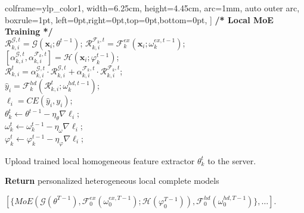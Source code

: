 \documentclass[sigconf]{acmart}
\begin{document}
\begin{algorithm}[h]
{{{\begin{tcolorbox}
                  colframe=ylp_color1,%
                  width=6.25cm,%
                  height=4.45cm,
                  arc=1mm, auto outer arc,
                  boxrule=1pt,
                  left=0pt,right=0pt,top=0pt,bottom=0pt,
                 ]
                 \textbf{/* Local MoE Training */} \\
                    $\boldsymbol{\mathcal{R}}_{k, i}^{\mathcal{G}, t}=\mathcal{G}(\boldsymbol{x}_i ; \theta^{t-1})$;
                    $\boldsymbol{\mathcal{R}}_{k, i}^{\mathcal{F}_{k},t}=\mathcal{F}_k^{e x}(\boldsymbol{x}_i ; \omega_k^{e x, t-1})$; \\
                    $[\alpha_{k, i}^{\mathcal{G}, t}, \alpha_{k, i}^{\mathcal{F}_{k}, t}]=\mathcal{H}(\boldsymbol{x}_i ; \varphi_k^{t-1})$; \\
                    $\boldsymbol{\mathcal{R}}_{k, i}^t=\alpha_{k, i}^{\mathcal{G}, t} \cdot \boldsymbol{\mathcal{R}}_{k, i}^{\mathcal{G}, t}+\alpha_{k, i}^{\mathcal{F}_{k}, t} \cdot \boldsymbol{\mathcal{R}}_{k, i}^{\mathcal{F}_{k},t}$; \\
                    $\hat{y}_i=\mathcal{F}_k^{h d}(\boldsymbol{\mathcal{R}}_{k, i}^t ; \omega_k^{h d, t-1})$; \\
                    $\ell_i=C E(\hat{y}_i, y_i)$; \\
                    $\theta_k^t \gets \theta^{t-1}-\eta_\theta \nabla \ell_i$; \\
                    $\omega_k^t \gets \omega_k^{t-1}-\eta_\omega \nabla \ell_i$; \\
                    $\varphi_k^t \gets \varphi_k^{t-1}-\eta_{\varphi} \nabla \ell_i$; 
                     \end{tcolorbox}
                  }
                Upload trained local homogeneous feature extractor $\theta_k^t$ to the server.
            }
    }
     \textbf{Return} personalized heterogeneous local complete models 
      \begin{tcolorbox}[colback=ylp_color2,%
                  colframe=ylp_color1,%
                  width=8.4cm,%
                  height=0.75cm,
                  arc=1mm, auto outer arc,
                  boxrule=1pt,
                  left=0pt,right=0pt,top=0pt,bottom=0pt,
                 ]
     $[\{MoE(\mathcal{G}(\theta^{T-1}),\mathcal{F}_0^{ex}(\omega_0^{ex,T-1});\mathcal{H}(\varphi_0^{T-1})), \mathcal{F}_0^{hd}(\omega_0^{hd,T-1})\},\ldots]$.
      \end{tcolorbox}
\end{algorithm}
\end{document}
